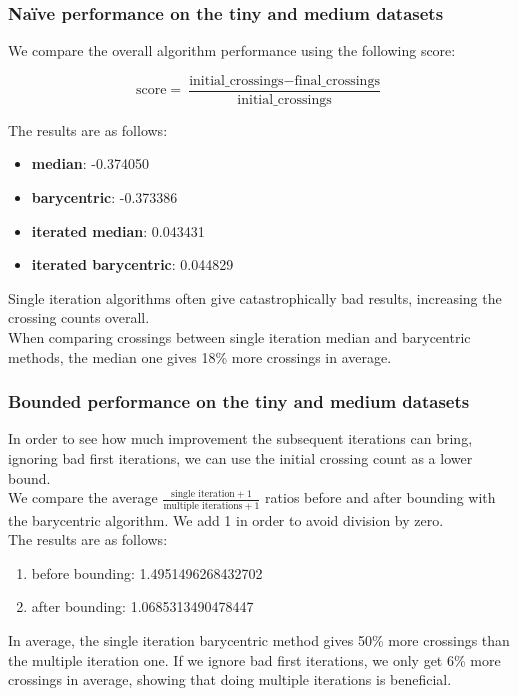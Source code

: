 \documentclass[a4paper]{article}
\begin{document}
\subsubsection*{Naïve performance on the tiny and medium datasets}

We compare the overall algorithm performance using the following score:

$$
	\text{score} = \frac{\text{initial\_crossings} - \text{final\_crossings}}{\text{initial\_crossings}}
$$

The results are as follows:
\begin{itemize}
	\item \textbf{median}: -0.374050
	\item \textbf{barycentric}: -0.373386
	\item \textbf{iterated median}: 0.043431
	\item \textbf{iterated barycentric}: 0.044829
\end{itemize}

Single iteration algorithms often give catastrophically bad results, increasing the crossing counts overall.\\

When comparing crossings between single iteration median and barycentric methods, the median one gives 18\% more crossings in average.

\subsubsection*{Bounded performance on the tiny and medium datasets}

In order to see how much improvement the subsequent iterations can bring, ignoring bad first iterations, we can use the initial crossing count as a lower bound.\\

We compare the average $\frac{\text{single iteration} + 1}{\text{multiple iterations} + 1}$ ratios before and after bounding with the barycentric algorithm. We add 1 in order to avoid division by zero.\\

The results are as follows:

\begin{enumerate}
	\item before bounding: 1.4951496268432702
	\item after bounding: 1.0685313490478447
\end{enumerate}

In average, the single iteration barycentric method gives 50\% more crossings than the multiple iteration one.
If we ignore bad first iterations, we only get 6\% more crossings in average, showing that doing multiple iterations is beneficial.

\eject



\end{document}
